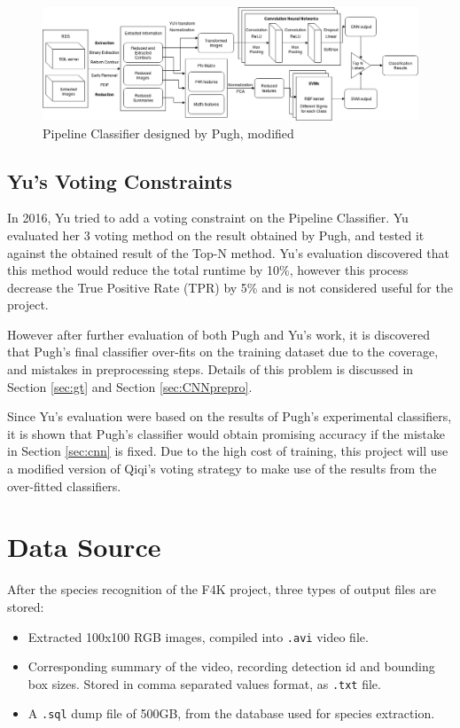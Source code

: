 \documentclass[bsc,logo,twoside,fullspacing,parskip]{infthesis}
\begin{document}
\begin{figure}[!h]
    \centering
    \includegraphics[scale=0.3]{graph/Pipeline_Classifier.png}
    \caption{Pipeline Classifier designed by Pugh, modified}
    \label{fig:pipeline}
\end{figure}

\section{Yu's Voting Constraints}

In 2016, Yu\cite{Yu} tried to add a voting constraint on the Pipeline Classifier. 
Yu evaluated her 3 voting method on the result obtained by Pugh, and tested it against the obtained result of the Top-N method. 
Yu's evaluation discovered that this method would reduce the total runtime by 10\%, however this process decrease the True Positive Rate (TPR) by 5\% and is not considered useful for the project. 

However after further evaluation of both Pugh and Yu's work, it is discovered that Pugh's final classifier over-fits on the training dataset due to the coverage, and mistakes in preprocessing steps. Details of this problem is discussed in Section \ref{sec:gt} and Section \ref{sec:CNNprepro}. 

Since Yu's evaluation were based on the results of Pugh's experimental classifiers, it is shown that Pugh's classifier would obtain promising accuracy if the mistake in Section \ref{sec:cnn} is fixed. Due to the high cost of training, this project will use a modified version of Qiqi's voting strategy to make use of the results from the over-fitted classifiers. 

\chapter{Data Source}
\label{chap:datasource}

After the species recognition of the F4K project, three types of output files are stored:
\begin{itemize}
\item
Extracted 100x100 RGB images, compiled into {\tt .avi} video file.
\item
Corresponding summary of the video, recording detection id and bounding box sizes. Stored in comma separated values format, as {\tt .txt} file.
\item
A {\tt .sql} dump file of 500GB, from the database used for species extraction.
\end{itemize}
\end{document}

